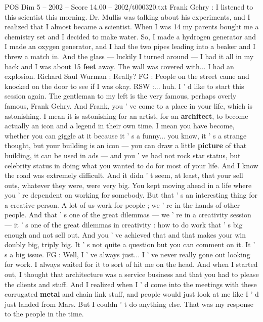 \begin{textsample}{POS Dim 5 – 2002 – Score 14.00 – 2002/t000320.txt}  \label{ex:f5_pos_002}
Frank Gehry : I listened to this scientist this morning.
Dr.
Mullis was talking about his experiments, and I realized that I almost became a scientist.
When I was 14 my parents bought me a chemistry set and I decided to make water.
So, I made a hydrogen generator and I made an oxygen generator, and I had the two pipes leading into a beaker and I threw a match in.
And the glass — luckily I turned around — I had it all in my back and I was about 15 \textbf{feet} away.
The wall was covered with...
I had an explosion.
Richard Saul Wurman : Really?
FG : People on the street came and knocked on the door to see if I was okay.
RSW :... huh.
I ' d like to start this session again.
The gentleman to my left is the very famous, perhaps overly famous, Frank Gehry.
And Frank, you ' ve come to a place in your life, which is astonishing.
I mean it is astonishing for an artist, for an \textbf{architect}, to become actually an icon and a legend in their own time.
I mean you have become, whether you can giggle at it because it ' s a funny... you know, it ' s a strange thought, but your building is an icon — you can draw a little \textbf{picture} of that building, it can be used in ads — and you ' ve had not rock star status, but celebrity status in doing what you wanted to do for most of your life.
And I know the road was extremely difficult.
And it didn ' t seem, at least, that your sell outs, whatever they were, were very big.
You kept moving ahead in a life where you ' re dependent on working for somebody.
But that ' s an interesting thing for a creative person.
A lot of us work for people ; we ' re in the hands of other people.
And that ' s one of the great dilemmas — we ' re in a creativity session — it ' s one of the great dilemmas in creativity : how to do work that ' s big enough and not sell out.
And you ' ve achieved that and that makes your win doubly big, triply big.
It ' s not quite a question but you can comment on it.
It ' s a big issue.
FG : Well, I ' ve always just...
I ' ve never really gone out looking for work.
I always waited for it to sort of hit me on the head.
And when I started out, I thought that architecture was a service business and that you had to please the clients and stuff.
And I realized when I ' d come into the meetings with these corrugated \textbf{metal} and chain link stuff, and people would just look at me like I ' d just landed from Mars.
But I couldn ' t do anything else.
That was my response to the people in the time.

\end{textsample}
